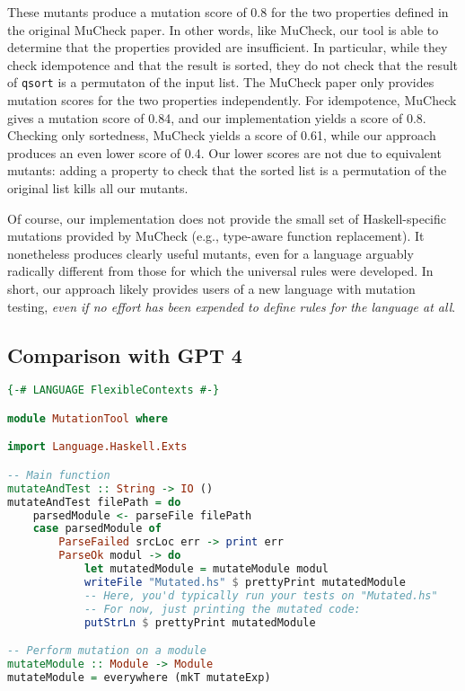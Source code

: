 \documentclass[acmsmall,screen,review,anonymous]{acmart}
\begin{document}
{These mutants produce a mutation
score of 0.8 for the two properties defined in the original MuCheck
paper.  In other words, like MuCheck, our tool is able to
determine that the properties provided are insufficient.  In
particular, while they check idempotence and that the result is
sorted, they do not check that the result of {\tt qsort} is a permutaton of the input
list.  The MuCheck paper only provides mutation scores for the two
properties independently.  For idempotence, MuCheck gives a mutation
score of 0.84, and our implementation yields a score of 0.8.  Checking
only sortedness, MuCheck yields a score of 0.61, while our approach
produces an even lower score of 0.4.  Our lower
scores are not due to equivalent mutants: adding a property to check
that the sorted list is a permutation of the original list kills all
our mutants.

Of course, our implementation does not provide the small set of Haskell-specific
mutations provided by MuCheck (e.g., type-aware function replacement).  It nonetheless produces clearly useful
mutants, even for a language arguably radically different from those
for which the universal rules were developed.  In short, our approach
likely provides users of a new language with mutation testing,
\emph{even if no effort has been expended to define rules for the
  language at all}.

\subsection{Comparison with GPT 4}

\begin{lstlisting}[language=haskell,caption={\textbf{Haskell Mutation Tool}},label=lst:mutationTool]
{-# LANGUAGE FlexibleContexts #-}

module MutationTool where

import Language.Haskell.Exts

-- Main function
mutateAndTest :: String -> IO ()
mutateAndTest filePath = do
    parsedModule <- parseFile filePath
    case parsedModule of
        ParseFailed srcLoc err -> print err
        ParseOk modul -> do
            let mutatedModule = mutateModule modul
            writeFile "Mutated.hs" $ prettyPrint mutatedModule
            -- Here, you'd typically run your tests on "Mutated.hs"
            -- For now, just printing the mutated code:
            putStrLn $ prettyPrint mutatedModule

-- Perform mutation on a module
mutateModule :: Module -> Module
mutateModule = everywhere (mkT mutateExp)


\end{lstlisting}}
\end{document}
